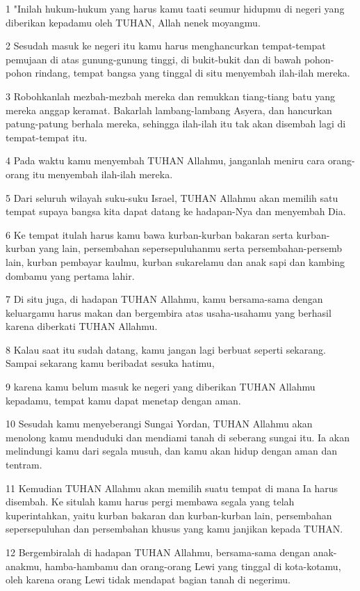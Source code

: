 \par 1 "Inilah hukum-hukum yang harus kamu taati seumur hidupmu di negeri yang diberikan kepadamu oleh TUHAN, Allah nenek moyangmu.
\par 2 Sesudah masuk ke negeri itu kamu harus menghancurkan tempat-tempat pemujaan di atas gunung-gunung tinggi, di bukit-bukit dan di bawah pohon-pohon rindang, tempat bangsa yang tinggal di situ menyembah ilah-ilah mereka.
\par 3 Robohkanlah mezbah-mezbah mereka dan remukkan tiang-tiang batu yang mereka anggap keramat. Bakarlah lambang-lambang Asyera, dan hancurkan patung-patung berhala mereka, sehingga ilah-ilah itu tak akan disembah lagi di tempat-tempat itu.
\par 4 Pada waktu kamu menyembah TUHAN Allahmu, janganlah meniru cara orang-orang itu menyembah ilah-ilah mereka.
\par 5 Dari seluruh wilayah suku-suku Israel, TUHAN Allahmu akan memilih satu tempat supaya bangsa kita dapat datang ke hadapan-Nya dan menyembah Dia.
\par 6 Ke tempat itulah harus kamu bawa kurban-kurban bakaran serta kurban-kurban yang lain, persembahan sepersepuluhanmu serta persembahan-persemb lain, kurban pembayar kaulmu, kurban sukarelamu dan anak sapi dan kambing dombamu yang pertama lahir.
\par 7 Di situ juga, di hadapan TUHAN Allahmu, kamu bersama-sama dengan keluargamu harus makan dan bergembira atas usaha-usahamu yang berhasil karena diberkati TUHAN Allahmu.
\par 8 Kalau saat itu sudah datang, kamu jangan lagi berbuat seperti sekarang. Sampai sekarang kamu beribadat sesuka hatimu,
\par 9 karena kamu belum masuk ke negeri yang diberikan TUHAN Allahmu kepadamu, tempat kamu dapat menetap dengan aman.
\par 10 Sesudah kamu menyeberangi Sungai Yordan, TUHAN Allahmu akan menolong kamu menduduki dan mendiami tanah di seberang sungai itu. Ia akan melindungi kamu dari segala musuh, dan kamu akan hidup dengan aman dan tentram.
\par 11 Kemudian TUHAN Allahmu akan memilih suatu tempat di mana Ia harus disembah. Ke situlah kamu harus pergi membawa segala yang telah kuperintahkan, yaitu kurban bakaran dan kurban-kurban lain, persembahan sepersepuluhan dan persembahan khusus yang kamu janjikan kepada TUHAN.
\par 12 Bergembiralah di hadapan TUHAN Allahmu, bersama-sama dengan anak-anakmu, hamba-hambamu dan orang-orang Lewi yang tinggal di kota-kotamu, oleh karena orang Lewi tidak mendapat bagian tanah di negerimu.
